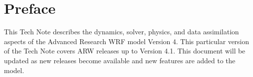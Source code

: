 \chapter*{Preface}

\hskip 20pt 
\noindent
This Tech Note describes the dynamics, solver, physics, and data assimilation aspects of the Advanced
Research WRF model Version 4. This particular version of the Tech Note covers ARW releases up to Version 4.1.
This document will be updated as new releases become available and new features are added to the model.

